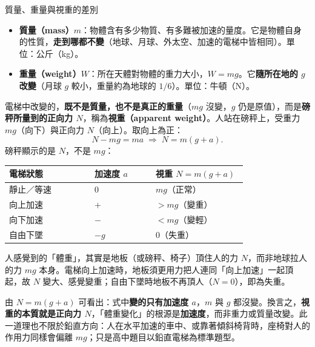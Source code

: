 \documentclass[11pt]{article}
\begin{document}
\begin{補充框}{質量、重量與視重的差別}
\begin{itemize}\setlength{\itemsep}{1pt}
\item \textbf{質量（mass）$m$}：物體含有多少物質、有多難被加速的量度。它是物體自身的性質，\textbf{走到哪都不變}（地球、月球、外太空、加速的電梯中皆相同）。單位：公斤（kg）。
\item \textbf{重量（weight）$W$}：所在天體對物體的重力大小，$W=mg$。它\textbf{隨所在地的 $g$ 改變}（月球 $g$ 較小，重量約為地球的 $1/6$）。單位：牛頓（N）。
\end{itemize}

電梯中改變的，\textbf{既不是質量，也不是真正的重量}（$mg$ 沒變，$g$ 仍是原值），而是\textbf{磅秤所量到的正向力 $N$}，稱為\textbf{視重（apparent weight）}。人站在磅秤上，受重力 $mg$（向下）與正向力 $N$（向上）。取向上為正：
$$N - mg = ma \;\Rightarrow\; \boxed{N = m(g+a)}.$$
磅秤顯示的是 $N$，不是 $mg$：

\begin{center}
\renewcommand{\arraystretch}{1.3}
\begin{tabular}{p{0.28\linewidth} p{0.20\linewidth} p{0.30\linewidth}}
\hline
\textbf{電梯狀態} & \textbf{加速度 $a$} & \textbf{視重 $N=m(g+a)$} \\
\hline
靜止／等速 & $0$ & $mg$（正常）\\
向上加速 & $+$ & $>mg$（變重）\\
向下加速 & $-$ & $<mg$（變輕）\\
自由下墜 & $-g$ & $0$（失重）\\
\hline
\end{tabular}
\end{center}

人感覺到的「體重」，其實是地板（或磅秤、椅子）頂住人的力 $N$，而非地球拉人的力 $mg$ 本身。電梯向上加速時，地板須更用力把人連同「向上加速」一起頂起，故 $N$ 變大、感覺變重；自由下墜時地板不再頂人（$N=0$），即為失重。


由 $N=m(g+a)$ 可看出：式中\textbf{變的只有加速度 $a$}，$m$ 與 $g$ 都沒變。換言之，\textbf{視重的本質就是正向力 $N$}，「體重變化」的根源是\textbf{加速度}，而非重力或質量改變。此一道理也不限於鉛直方向：人在水平加速的車中、或靠著傾斜椅背時，座椅對人的作用力同樣會偏離 $mg$；只是高中題目以鉛直電梯為標準題型。


\end{補充框}
\end{document}
